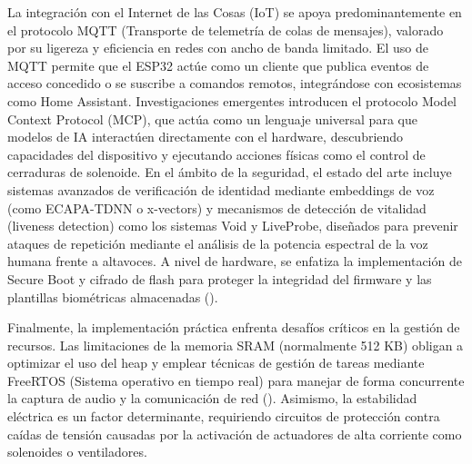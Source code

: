 La integración con el Internet de las Cosas (IoT) se apoya predominantemente en el
protocolo MQTT (Transporte de telemetría de colas de mensajes), valorado por su ligereza y
eficiencia en redes con ancho de banda limitado. El uso de MQTT permite que el ESP32 actúe
como un cliente que publica eventos de acceso concedido o se suscribe a comandos remotos,
integrándose con ecosistemas como Home Assistant. Investigaciones emergentes introducen
el protocolo Model Context Protocol (MCP), que actúa como un lenguaje universal para que
modelos de IA interactúen directamente con el hardware, descubriendo capacidades del
dispositivo y ejecutando acciones físicas como el control de cerraduras de solenoide.
En el ámbito de la seguridad, el estado del arte incluye sistemas avanzados de verificación
de identidad mediante embeddings de voz (como ECAPA-TDNN o x-vectors) y mecanismos
de detección de vitalidad (liveness detection) como los sistemas Void y LiveProbe, diseñados
para prevenir ataques de repetición mediante el análisis de la potencia espectral de la voz
humana frente a altavoces. A nivel de hardware, se enfatiza la implementación de Secure
Boot y cifrado de flash para proteger la integridad del firmware y las plantillas biométricas
almacenadas (\cite{jain}).

Finalmente, la implementación práctica enfrenta desafíos críticos en la gestión de
recursos. Las limitaciones de la memoria SRAM (normalmente 512 KB) obligan a optimizar
el uso del heap y emplear técnicas de gestión de tareas mediante FreeRTOS (Sistema
operativo en tiempo real) para manejar de forma concurrente la captura de audio y la
comunicación de red (\cite{nguyen}). Asimismo, la estabilidad eléctrica es un factor
determinante, requiriendo circuitos de protección contra caídas de tensión causadas por la
activación de actuadores de alta corriente como solenoides o ventiladores.